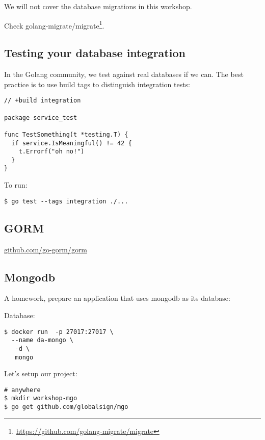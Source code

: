 \documentclass[11pt, letterpaper]{article}
\begin{document}
We will not cover the database migrations in this workshop.

\bigskip

Check golang-migrate/migrate\footnote{\href{https://github.com/golang-migrate/migrate}{https://github.com/golang-migrate/migrate}}.

\subsection{Testing your database integration}

In the Golang community, we test against real databases if we can. The best practice is to use build tags to distinguish integration tests:

\begin{verbatim}
// +build integration

package service_test

func TestSomething(t *testing.T) {
  if service.IsMeaningful() != 42 {
    t.Errorf("oh no!")
  }
}
\end{verbatim}

To run:

\begin{verbatim}
$ go test --tags integration ./...
\end{verbatim}


\subsection{GORM}

\href{https://github.com/go-gorm/gorm}{github.com/go-gorm/gorm}


\subsection{Mongodb}

A homework, prepare an application that uses mongodb as its database:

Database:

\begin{verbatim}
$ docker run  -p 27017:27017 \
  --name da-mongo \
   -d \ 
   mongo
\end{verbatim}


Let's setup our project:

\begin{verbatim}
# anywhere 
$ mkdir workshop-mgo
$ go get github.com/globalsign/mgo
\end{verbatim}
\end{document}
